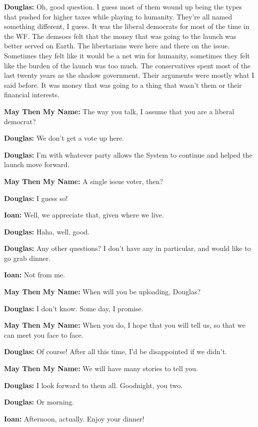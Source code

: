 \textbf{Douglas:} Oh, good question. I guess most of them wound up being the types that pushed for higher taxes while playing to humanity. They're all named something different, I guess. It was the liberal democrats for most of the time in the WF. The demsocs felt that the money that was going to the launch was better served on Earth. The libertarians were here and there on the issue. Sometimes they felt like it would be a net win for humanity, sometimes they felt like the burden of the launch was too much. The conservatives spent most of the last twenty years as the shadow government. Their arguments were mostly what I said before. It was money that was going to a thing that wasn't them or their financial interests.

\textbf{May Then My Name:} The way you talk, I assume that you are a liberal democrat?

\textbf{Douglas:} We don't get a vote up here.

\textbf{Douglas:} I'm with whatever party allows the System to continue and helped the launch move forward.

\textbf{May Then My Name:} A single issue voter, then?

\textbf{Douglas:} I guess so!

\textbf{Ioan:} Well, we appreciate that, given where we live.

\textbf{Douglas:} Haha, well, good.

\textbf{Douglas:} Any other questions? I don't have any in particular, and would like to go grab dinner.

\textbf{Ioan:} Not from me.

\textbf{May Then My Name:} When will you be uploading, Douglas?

\textbf{Douglas:} I don't know. Some day, I promise.

\textbf{May Then My Name:} When you do, I hope that you will tell us, so that we can meet you face to face.

\textbf{Douglas:} Of course! After all this time, I'd be disappointed if we didn't.

\textbf{May Then My Name:} We will have many stories to tell you.

\textbf{Douglas:} I look forward to them all. Goodnight, you two.

\textbf{Douglas:} Or morning.

\textbf{Ioan:} Afternoon, actually. Enjoy your dinner!
